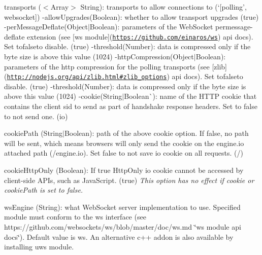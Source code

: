 \begin{DoxyItemize}
\begin{DoxyItemize}
\begin{DoxyItemize}
\item {\ttfamily transports} ({\ttfamily $<$Array$>$ String})\+: transports to allow connections to (`\mbox{[}\textquotesingle{}polling', \textquotesingle{}websocket\textquotesingle{}\mbox{]}{\ttfamily ) -\/}allow\+Upgrades{\ttfamily (}Boolean{\ttfamily )\+: whether to allow transport upgrades (}true{\ttfamily ) -\/}per\+Message\+Deflate{\ttfamily (}Object$\vert$\+Boolean{\ttfamily )\+: parameters of the Web\+Socket permessage-\/deflate extension (see \mbox{[}ws module\mbox{]}(\href{https://github.com/einaros/ws}{\tt https\+://github.\+com/einaros/ws}) api docs). Set to}false{\ttfamily to disable. (}true{\ttfamily ) -\/}threshold{\ttfamily (}Number{\ttfamily )\+: data is compressed only if the byte size is above this value (}1024{\ttfamily ) -\/}http\+Compression{\ttfamily (}Object$\vert$\+Boolean{\ttfamily )\+: parameters of the http compression for the polling transports (see \mbox{[}zlib\mbox{]}(\href{http://nodejs.org/api/zlib.html#zlib_options}{\tt http\+://nodejs.\+org/api/zlib.\+html\#zlib\+\_\+options}) api docs). Set to}false{\ttfamily to disable. (}true{\ttfamily ) -\/}threshold{\ttfamily (}Number{\ttfamily )\+: data is compressed only if the byte size is above this value (}1024{\ttfamily ) -\/}cookie{\ttfamily (}String$\vert$\+Boolean\`{})\+: name of the H\+T\+TP cookie that contains the client sid to send as part of handshake response headers. Set to {\ttfamily false} to not send one. ({\ttfamily io})
\item {\ttfamily cookie\+Path} ({\ttfamily String$\vert$\+Boolean})\+: path of the above {\ttfamily cookie} option. If false, no path will be sent, which means browsers will only send the cookie on the engine.\+io attached path ({\ttfamily /engine.io}). Set false to not save io cookie on all requests. ({\ttfamily /})
\item {\ttfamily cookie\+Http\+Only} ({\ttfamily Boolean})\+: If {\ttfamily true} Http\+Only io cookie cannot be accessed by client-\/side A\+P\+Is, such as Java\+Script. ({\ttfamily true}) {\itshape This option has no effect if {\ttfamily cookie} or {\ttfamily cookie\+Path} is set to {\ttfamily false}.}
\item {\ttfamily ws\+Engine} ({\ttfamily String})\+: what Web\+Socket server implementation to use. Specified module must conform to the {\ttfamily ws} interface (see https\+://github.com/websockets/ws/blob/master/doc/ws.\+md \char`\"{}ws module api docs\char`\"{}). Default value is {\ttfamily ws}. An alternative c++ addon is also available by installing {\ttfamily uws} module.

\end{DoxyItemize}
\end{DoxyItemize}
\end{DoxyItemize}
